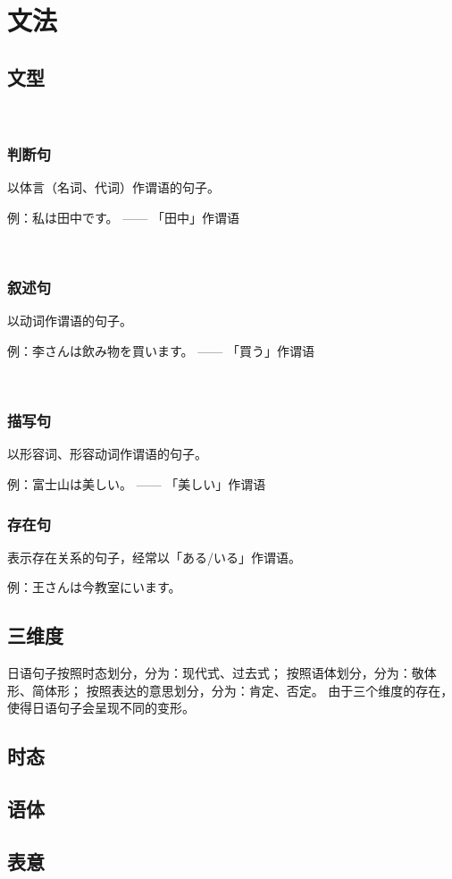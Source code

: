 \chapter{文法}
\newpage

\section{文型}

　　\subsection{判断句}

    以体言（名词、代词）作谓语的句子。
    
    例：私は田中です。
    —— 「田中」作谓语

　　\subsection{叙述句}

    以动词作谓语的句子。
    
    例：李さんは飲み物を買います。
    —— 「買う」作谓语


　　\subsection{描写句}

    以形容词、形容动词作谓语的句子。
    
    例：富士山は美しい。
    —— 「美しい」作谓语

    \subsection{存在句}
    
    表示存在关系的句子，经常以「ある/いる」作谓语。
    
    例：王さんは今教室にいます。

    \section{三维度}

    日语句子按照时态划分，分为：现代式、过去式；
    按照语体划分，分为：敬体形、简体形；
    按照表达的意思划分，分为：肯定、否定。
    由于三个维度的存在，使得日语句子会呈现不同的变形。

    \section{时态}

    \section{语体}

    \section{表意}

\newpage